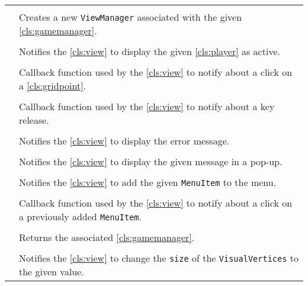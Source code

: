 \paragraph*{}
\begin{longtable}{Lp{10cm}}
	\startmethodtable
	 \\
	& Creates a new \texttt{ViewManager} associated with the given \ref{cls:gamemanager}. \\
	 \\
	& Notifies the \ref{cls:view} to display the given \ref{cls:player} as active. \\
	 \\
	& Callback function used by the \ref{cls:view} to notify about a click on a \ref{cls:gridpoint}.  \\
	 \\
	& Callback function used by the \ref{cls:view} to notify about a key release. \\
	 \\
	& Notifies the \ref{cls:view} to display the error message. \\
	 \\
	& Notifies the \ref{cls:view} to display the given message in a pop-up. \\
	 \\
	& Notifies the \ref{cls:view} to add the given \texttt{MenuItem} to the menu. \\
	 \\
	& Callback function used by the \ref{cls:view} to notify about a click on a previously added \texttt{MenuItem}.  \\
	 \\
	& Returns the associated \ref{cls:gamemanager}. \\
	 \\
	& Notifies the \ref{cls:view} to change the \texttt{size} of the \texttt{VisualVertices} to the given value. \\
	\hline
\end{longtable}

